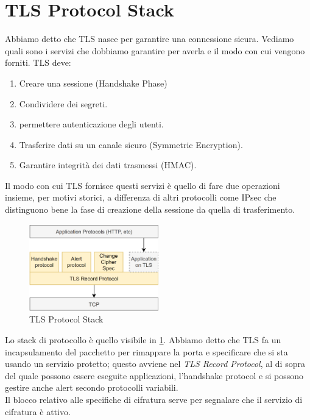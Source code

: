 \section{TLS Protocol Stack}
Abbiamo detto che TLS nasce per garantire una connessione sicura. Vediamo quali sono i servizi che dobbiamo garantire per averla e il modo con cui vengono forniti. TLS deve:
\begin{proposition}
\begin{enumerate}
    \item Creare una sessione (Handshake Phase)
    \item Condividere dei segreti.
    \item permettere autenticazione degli utenti.
    \item Trasferire dati su un canale sicuro (Symmetric Encryption).
    \item Garantire integrità dei dati trasmessi (HMAC).
\end{enumerate}
\end{proposition}
Il modo con cui TLS fornisce questi servizi è quello di fare due operazioni insieme, per motivi storici, a differenza di altri protocolli come IPsec che distinguono bene la fase di creazione della sessione da quella di trasferimento.\\
\begin{figure}
\vspace{-7mm}
    \centering
    \includegraphics[width=0.5\textwidth]{image/tlsstack.png}
    \caption{TLS Protocol Stack}
    \label{fig:tlsstack}
\end{figure}
Lo stack di protocollo è quello visibile in \cref{fig:tlsstack}. Abbiamo detto che TLS fa un incapsulamento del pacchetto per rimappare la porta e specificare che si sta usando un servizio protetto; questo avviene nel \textit{TLS Record Protocol}, al di sopra del quale possono essere eseguite applicazioni, l'handshake protocol e si possono gestire anche alert secondo protocolli variabili. \\Il blocco relativo alle specifiche di cifratura serve per segnalare che il servizio di cifratura è attivo.
